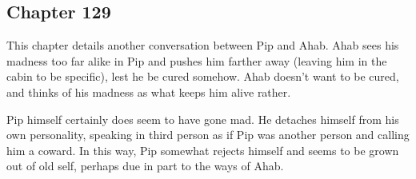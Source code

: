 \subsection{Chapter 129}

This chapter details another conversation between Pip and Ahab. Ahab sees his
madness too far alike in Pip and pushes him farther away (leaving him in the
cabin to be specific), lest he be cured somehow. Ahab doesn't want to be cured,
and thinks of his madness as what keeps him alive rather.

Pip himself certainly does seem to have gone mad. He detaches himself from his
own personality, speaking in third person as if Pip was another person and
calling him a coward. In this way, Pip somewhat rejects himself and seems to be
grown out of old self, perhaps due in part to the ways of Ahab.

